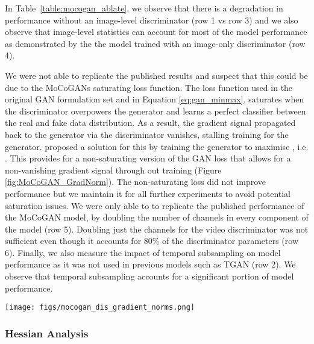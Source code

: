 \documentclass[a4paper,fleqn]{cas-sc}
\begin{document}
In Table~\ref{table:mocogan_ablate}, we observe that there is a degradation in performance without an image-level discriminator (row 1 vs row 3) and we also observe that image-level statistics can account for most of the model performance as demonstrated by the the model trained with an image-only discriminator (row 4). 

We were not able to replicate the published results and suspect that this could be due to the MoCoGANs saturating loss function. The loss function used in the original GAN formulation set  and  in Equation \ref{eq:gan_minmax}.  saturates when the discriminator overpowers the generator and learns a perfect classifier between the real and fake data distribution. As a result, the gradient signal propagated back to the generator via the discriminator vanishes, stalling training for the generator. \citet{GoodfellowPMXWOCB14generative} proposed a solution for this by training the generator to maximise , i.e. . This provides for a non-saturating version of the GAN loss that allows for a non-vanishing gradient signal through out training (Figure \ref{fig:MoCoGAN_GradNorm}). The non-saturating loss did not improve performance but we maintain it for all further experiments to avoid potential saturation issues. We were only able to to replicate the published performance of the MoCoGAN model, by doubling the number of channels in every component of the model (row 5). Doubling just the channels for the video discriminator was not sufficient even though it accounts for 80\% of the discriminator parameters (row 6). Finally, we also measure the impact of temporal subsampling on model performance as it was not used in previous models such as TGAN (row 2). We observe that temporal subsampling accounts for a significant portion of model performance.  


\begin{figure*}
    \centering
    \texttt{[image: figs/mocogan\_dis\_gradient\_norms.png]}
    \caption{Norm of the gradient at each node in the computation graph for batches of real and fake data.} 
    \label{fig:MoCoGAN_GradNorm}
\end{figure*}


\subsubsection{Hessian Analysis}
\label{sec:hess}
\end{document}
